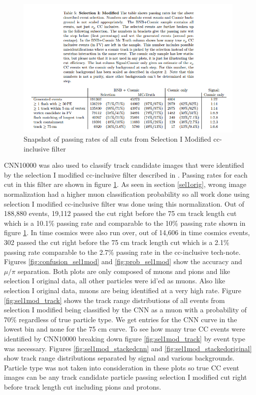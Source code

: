 \begin{figure}[htp!]
\centering
\includegraphics[width=.8\textwidth]{figs/cuttable_sel1mod.png}
\caption{Snapshot of passing rates of all cuts from Selection I Modified cc-inclusive filter}
\label{fig:table1}
\end{figure}

CNN10000 was also used to classify track candidate images that were identified by the selection I modified cc-inclusive filter described in \cite{cc-inclusive}. Passing rates for each cut in this filter are shown in figure \ref{fig:table1}. As seen in section \ref{sel1orig}, wrong image normalization had a higher muon classification probability so all work done using selection I modified cc-inclusive filter was done using this normalization. Out of 188,880 events, 19,112 passed the cut right before the 75 cm track length cut which is a 10.1\% passing rate and comparable to the 10\% passing rate shown in figure \ref{fig:table1}. In time cosmics were also run over, out of 14,606 in time cosmics events, 302 passed the cut right before the 75 cm track length cut which is a 2.1\% passing rate comparable to the 2.7\% passing rate in the cc-inclusive tech-note. Figures \ref{fig:confusion_sel1mod} and \ref{fig:prob_sel1mod} show the accuracy and $\mu/\pi$ separation. Both plots are only composed of muons and pions and like selection I original data, all other particles were id'ed as muons. Also like selection I original data, muons are being identified at a very high rate. 
Figure \ref{fig:sel1mod_track} shows the track range distributions of all events from selection I modified being classified by the CNN as a muon with a probability of 70\% regardless of true particle type. We get entries for the CNN curve in the lowest bin and none for the 75 cm curve. To see how many true CC events were identified by CNN10000 breaking down figure \ref{fig:sel1mod_track} by event type was necessary. Figures \ref{fig:sel1mod_stackedcnn} and \ref{fig:sel1mod_stackedoriginal} show track range distributions separated by signal and various backgrounds. Particle type was not taken into consideration in these plots so true CC event images can be any track candidate particle passing selection I modified cut right before track length cut including pions and protons. 

